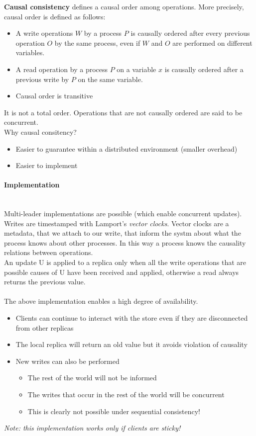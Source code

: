 \documentclass[10pt,a4paper]{article}
\newcommand{\myparagraph}[1]{\paragraph{#1}\mbox{}\\[0.05in]}
\begin{document}
\textbf{Causal consistency} defines a causal order among operations. More precisely, causal order is defined as follows:
\begin{itemize}
	\item A write operations $W$ by a process $P$ is causally ordered after every previous operation $O$ by the same process, even if $W$ and $O$ are performed on different variables.
	\item A read operation by a process $P$ on a variable $x$ is causally ordered after a previous write by $P$ on the same variable.
	\item Causal order is transitive
\end{itemize}
It is not a total order. Operations that are not causally ordered are said to be concurrent. \\
Why causal consitency? 
\begin{itemize}
	\item Easier to guarantee within a distributed environment (smaller overhead)
	\item Easier to implement
\end{itemize}
\myparagraph{Implementation}
Multi-leader implementations are possible (which enable concurrent updates). \\ Writes are timestamped with Lamport's \textit{vector clocks}. Vector clocks are a metadata, that we attach to our write, that inform the systm about what the process knows about other processes. In this way a process knows the causality relations between operations. \\ An update U is applied to a replica only when all the write operations that are possible causes of U have been received and applied, otherwise a read always returns the previous value. \\ \\
The above implementation enables a high degree of availability.
\begin{itemize}
	\item Clients can continue to interact with the store even if they are disconnected from other replicas
	\item The local replica will return an old value but it avoids violation of causality
	\item New writes can also be performed
	\begin{itemize}
		\item The rest of the world will not be informed
		\item The writes that occur in the rest of the world will be concurrent
		\item This is clearly not possible under sequential consistency!
	\end{itemize}
\end{itemize}
\textit{Note: this implementation works only if clients are sticky!}
\end{document}

